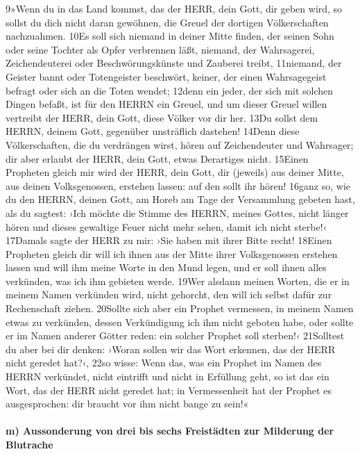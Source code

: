 9»Wenn du in das Land kommst, das der HERR, dein Gott, dir geben wird,
so sollst du dich nicht daran gewöhnen, die Greuel der dortigen
Völkerschaften nachzuahmen. 10Es soll sich niemand in deiner Mitte
finden, der seinen Sohn oder seine Tochter als Opfer verbrennen läßt,
niemand, der Wahrsagerei, Zeichendeuterei oder Beschwörungskünste und
Zauberei treibt, 11niemand, der Geister bannt oder Totengeister
beschwört, keiner, der einen Wahrsagegeist befragt oder sich an die
Toten wendet; 12denn ein jeder, der sich mit solchen Dingen befaßt, ist
für den HERRN ein Greuel, und um dieser Greuel willen vertreibt der
HERR, dein Gott, diese Völker vor dir her. 13Du sollst dem HERRN, deinem
Gott, gegenüber unsträflich dastehen! 14Denn diese Völkerschaften, die
du verdrängen wirst, hören auf Zeichendeuter und Wahrsager; dir aber
erlaubt der HERR, dein Gott, etwas Derartiges nicht. 15Einen Propheten
gleich mir wird der HERR, dein Gott, dir (jeweils) aus deiner Mitte, aus
deinen Volksgenossen, erstehen lassen: auf den sollt ihr hören! 16ganz
so, wie du den HERRN, deinen Gott, am Horeb am Tage der Versammlung
gebeten hast, als du sagtest: ›Ich möchte die Stimme des HERRN, meines
Gottes, nicht länger hören und dieses gewaltige Feuer nicht mehr sehen,
damit ich nicht sterbe!‹ 17Damals sagte der HERR zu mir: ›Sie haben mit
ihrer Bitte recht! 18Einen Propheten gleich dir will ich ihnen aus der
Mitte ihrer Volksgenossen erstehen lassen und will ihm meine Worte in
den Mund legen, und er soll ihnen alles verkünden, was ich ihm gebieten
werde. 19Wer alsdann meinen Worten, die er in meinem Namen verkünden
wird, nicht gehorcht, den will ich selbst dafür zur Rechenschaft ziehen.
20Sollte sich aber ein Prophet vermessen, in meinem Namen etwas zu
verkünden, dessen Verkündigung ich ihm nicht geboten habe, oder sollte
er im Namen anderer Götter reden: ein solcher Prophet soll sterben!‹
21Solltest du aber bei dir denken: ›Woran sollen wir das Wort erkennen,
das der HERR nicht geredet hat?‹, 22so wisse: Wenn das, was ein Prophet
im Namen des HERRN verkündet, nicht eintrifft und nicht in Erfüllung
geht, so ist das ein Wort, das der HERR nicht geredet hat; in
Vermessenheit hat der Prophet es ausgesprochen: dir braucht vor ihm
nicht bange zu sein!«

\hypertarget{m-aussonderung-von-drei-bis-sechs-freistuxe4dten-zur-milderung-der-blutrache}{%
\paragraph{m) Aussonderung von drei bis sechs Freistädten zur Milderung
der
Blutrache}\label{m-aussonderung-von-drei-bis-sechs-freistuxe4dten-zur-milderung-der-blutrache}}

